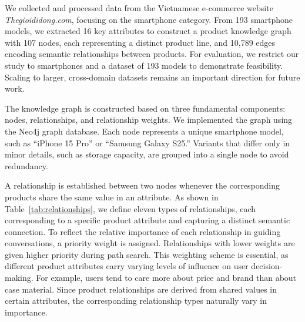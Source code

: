We collected and processed data from the Vietnamese e-commerce website \textit{Thegioididong.com}, focusing on the smartphone category. From 193 smartphone models, we extracted 16 key attributes to construct a product knowledge graph with 107 nodes, each representing a distinct product line, and 10,789 edges encoding semantic relationships between products. For evaluation, we restrict our study to smartphones and a dataset of 193 models to demonstrate feasibility. Scaling to larger, cross-domain datasets remains an important direction for future work.


The knowledge graph is constructed based on three fundamental components: nodes, relationships, and relationship weights. We implemented the graph using the Neo4j graph database. Each node represents a unique smartphone model, such as “iPhone 15 Pro” or “Samsung Galaxy S25.” Variants that differ only in minor details, such as storage capacity, are grouped into a single node to avoid redundancy.

A relationship is established between two nodes whenever the corresponding products share the same value in an attribute. As shown in Table~\ref{tab:relationships}, we define eleven types of relationships, each corresponding to a specific product attribute and capturing a distinct semantic connection. To reflect the relative importance of each relationship in guiding conversations, a priority weight is assigned. Relationships with lower weights are given higher priority during path search. This weighting scheme is essential, as different product attributes carry varying levels of influence on user decision-making. For example, users tend to care more about price and brand than about case material. Since product relationships are derived from shared values in certain attributes, the corresponding relationship types naturally vary in importance.



